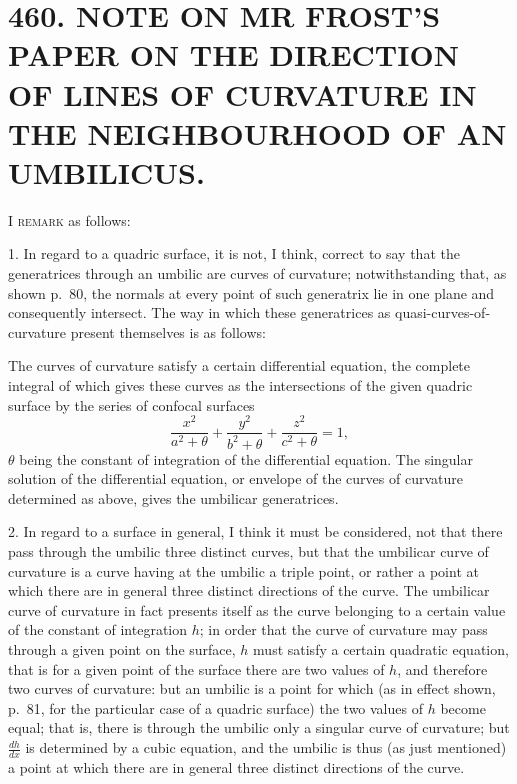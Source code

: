 \documentclass[11pt,a4paper]{article}
\newcommand{\article}[2]{\section*{#1. #2}}
\begin{document}
\newpage
\setcounter{page}{330}

\article{460}{NOTE ON MR FROST'S PAPER ON THE DIRECTION OF LINES OF CURVATURE IN THE NEIGHBOURHOOD OF AN UMBILICUS.}


\vspace{0.5em}

I \textsc{remark} as follows:

1. In regard to a quadric surface, it is not, I think, correct to say that the generatrices through an umbilic are curves of curvature; notwithstanding that, as shown p.~80, the normals at every point of such generatrix lie in one plane and consequently intersect. The way in which these generatrices as quasi-curves-of-curvature present themselves is as follows:

The curves of curvature satisfy a certain differential equation, the complete integral of which gives these curves as the intersections of the given quadric surface by the series of confocal surfaces
\[
\frac{x^{2}}{a^{2}+\theta} + \frac{y^{2}}{b^{2}+\theta} + \frac{z^{2}}{c^{2}+\theta} = 1,
\]
$\theta$ being the constant of integration of the differential equation. The singular solution of the differential equation, or envelope of the curves of curvature determined as above, gives the umbilicar generatrices.

2. In regard to a surface in general, I think it must be considered, not that there pass through the umbilic three distinct curves, but that the umbilicar curve of curvature is a curve having at the umbilic a triple point, or rather a point at which there are in general three distinct directions of the curve. The umbilicar curve of curvature in fact presents itself as the curve belonging to a certain value of the constant of integration $h$; in order that the curve of curvature may pass through a given point on the surface, $h$ must satisfy a certain quadratic equation, that is for a given point of the surface there are two values of $h$, and therefore two curves of curvature: but an umbilic is a point for which (as in effect shown, p.~81, for the particular case of a quadric surface) the two values of $h$ become equal; that is, there is through the umbilic only a singular curve of curvature; but $\frac{dh}{dx}$ is determined by a cubic equation, and the umbilic is thus (as just mentioned) a point at which there are in general three distinct directions of the curve.
\end{document}
